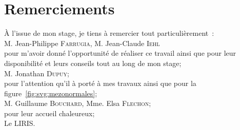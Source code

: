 \documentclass[10pt,a4paper,twoside, twocolumn]{report}
\begin{document}
{}
\section*{Remerciements}

\begin{center}

  \vfill
  
  À l'issue de mon stage, je tiens à remercier tout particulièrement~:\\
  \vspace{1cm}	
  M. Jean-Philippe \textsc{Farrugia}, M. Jean-Claude \textsc{Iehl}\\
  pour m'avoir donné l'opportunité de réaliser ce travail ainsi que pour leur disponibilité et leurs conseils tout au long de mon stage;\\
  \vspace{1cm}
  M. Jonathan \textsc{Dupuy};\\
  pour l'attention qu'il à porté à mes travaux ainsi que pour la figure~\ref{fig:svg:mezonormales};\\
	\vspace{1cm}
  M. Guillaume \textsc{Bouchard}, Mme. Elsa \textsc{Flechon};\\
  pour leur accueil chaleureux;\\
  \vspace{1cm}
  Le LIRIS.

  \vfill

\end{center}
\end{document}
